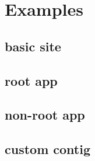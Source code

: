 \chapter{Examples}

\section{basic site}

\section{root app}

\section{non-root app}

\section{custom contig}


